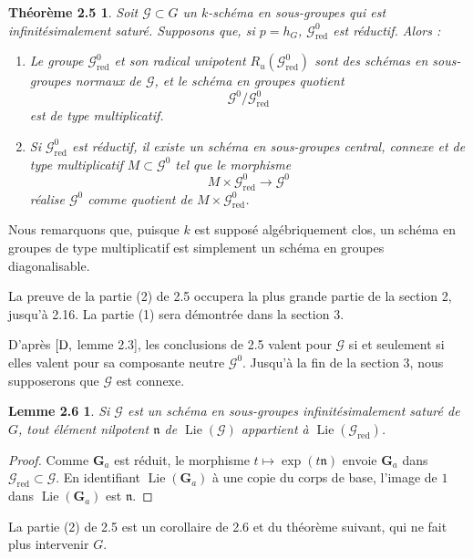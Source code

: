 \documentclass[11pt]{article}
\newtheorem*{theoreme25}{Théorème 2.5}
\newtheorem*{lemme26}{Lemme 2.6}
\newcommand{\Ga}{\mathbf G_a}
\newcommand{\Lie}{\operatorname{Lie}}
\newcommand{\Ru}{R_u}
\newcommand{\red}{\mathrm{red}}
\begin{document}
\begin{theoreme25}
Soit \(\mathcal G\subset G\) un \(k\)-schéma en sous-groupes qui est infinitésimalement
saturé. Supposons que, si \(p=h_G\), \(\mathcal G^0_{\red}\) est réductif. Alors :
\begin{enumerate}[label=(\arabic*),leftmargin=2em]
\item Le groupe \(\mathcal G^0_{\red}\) et son radical unipotent
\(\Ru(\mathcal G^0_{\red})\) sont des schémas en sous-groupes normaux de
\(\mathcal G\), et le schéma en groupes quotient
\[
  \mathcal G^0/\mathcal G^0_{\red}
\]
est de type multiplicatif.
\item Si \(\mathcal G^0_{\red}\) est réductif, il existe un schéma en sous-groupes
central, connexe et de type multiplicatif \(M\subset \mathcal G^0\) tel que le morphisme
\[
  M\times \mathcal G^0_{\red}\longrightarrow \mathcal G^0
\]
réalise \(\mathcal G^0\) comme quotient de \(M\times \mathcal G^0_{\red}\).
\end{enumerate}
\end{theoreme25}

Nous remarquons que, puisque \(k\) est supposé algébriquement clos, un schéma en
groupes de type multiplicatif est simplement un schéma en groupes diagonalisable.

La preuve de la partie (2) de 2.5 occupera la plus grande partie de la section 2,
jusqu'à 2.16. La partie (1) sera démontrée dans la section 3.

D'après \([{\rm D},\) lemme 2.3], les conclusions de 2.5 valent pour \(\mathcal G\) si
et seulement si elles valent pour sa composante neutre \(\mathcal G^0\). Jusqu'à la fin
de la section 3, nous supposerons que \(\mathcal G\) est connexe.

\begin{lemme26}
Si \(\mathcal G\) est un schéma en sous-groupes infinitésimalement saturé de \(G\),
tout élément nilpotent \(\mathfrak n\) de \(\Lie(\mathcal G)\) appartient à
\(\Lie(\mathcal G_{\red})\).
\end{lemme26}

\begin{proof}
Comme \(\Ga\) est réduit, le morphisme \(t\mapsto \exp(t\mathfrak n)\) envoie
\(\Ga\) dans \(\mathcal G_{\red}\subset \mathcal G\). En identifiant \(\Lie(\Ga)\)
à une copie du corps de base, l'image de \(1\) dans \(\Lie(\Ga)\) est \(\mathfrak n\).
\end{proof}



La partie (2) de 2.5 est un corollaire de 2.6 et du théorème suivant, qui ne fait plus
intervenir \(G\).
\end{document}
